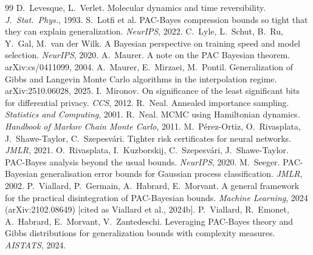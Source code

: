 \documentclass[11pt]{article}
\theoremstyle{definition}
\theoremstyle{remark}
\begin{document}
\begin{thebibliography}{99}
 D.~Levesque, L.~Verlet. Molecular dynamics and time reversibility. \emph{J.\ Stat.\ Phys.}, 1993.
 S.~Lotfi et al. PAC-Bayes compression bounds so tight that they can explain generalization. \emph{NeurIPS}, 2022.
 C.~Lyle, L.~Schut, B.~Ru, Y.~Gal, M.~van der Wilk. A Bayesian perspective on training speed and model selection. \emph{NeurIPS}, 2020.
 A.~Maurer. A note on the PAC Bayesian theorem. arXiv:cs/0411099, 2004.
 A.~Maurer, E.~Mirzaei, M.~Pontil. Generalization of Gibbs and Langevin Monte Carlo algorithms in the interpolation regime. arXiv:2510.06028, 2025.
 I.~Mironov. On significance of the least significant bits for differential privacy. \emph{CCS}, 2012.
 R.~Neal. Annealed importance sampling. \emph{Statistics and Computing}, 2001.
 R.~Neal. MCMC using Hamiltonian dynamics. \emph{Handbook of Markov Chain Monte Carlo}, 2011.
 M.~P\'erez-Ortiz, O.~Rivasplata, J.~Shawe-Taylor, C.~Szepesv\'ari. Tighter risk certificates for neural networks. \emph{JMLR}, 2021.
 O.~Rivasplata, I.~Kuzborskij, C.~Szepesv\'ari, J.~Shawe-Taylor. PAC-Bayes analysis beyond the usual bounds. \emph{NeurIPS}, 2020.
 M.~Seeger. PAC-Bayesian generalisation error bounds for Gaussian process classification. \emph{JMLR}, 2002.
 P.~Viallard, P.~Germain, A.~Habrard, E.~Morvant. A general framework for the practical disintegration of PAC-Bayesian bounds. \emph{Machine Learning}, 2024 (arXiv:2102.08649) [cited as Viallard et al., 2024b].
 P.~Viallard, R.~Emonet, A.~Habrard, E.~Morvant, V.~Zantedeschi. Leveraging PAC-Bayes theory and Gibbs distributions for generalization bounds with complexity measures. \emph{AISTATS}, 2024.
\end{thebibliography}
\end{document}
